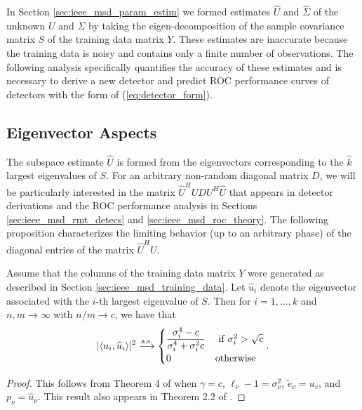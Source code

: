 In Section \ref{sec:ieee_msd_param_estim} we formed estimates $\widehat{U}$ and $\widehat{\Sigma}$ of the unknown $U$ and $\Sigma$ by taking the eigen-decomposition of the sample covariance matrix $S$ of the training data matrix $Y$. These estimates are inaccurate because the training data is noisy and contains only a finite number of observations. The following analysis specifically quantifies the accuracy of these estimates and is necessary to derive a new detector and predict ROC performance curves of detectors with the form of (\ref{eq:detector_form}).

\subsection{Eigenvector Aspects}\label{sec:ieee_msd_eigvect_aspects}

The subspace estimate $\widehat{U}$ is formed from the eigenvectors corresponding to the $\widehat{k}$ largest eigenvalues of $S$. For an arbitrary non-random diagonal matrix $D$, we will be particularly interested in the matrix $\widehat{U}^HUDU^H\widehat{U}$ that appears in detector derivations and the ROC performance analysis in Sections \ref{sec:ieee_msd_rmt_detecs} and \ref{sec:ieee_msd_roc_theory}. The following proposition characterizes the limiting behavior (up to an arbitrary phase) of the diagonal entries of the matrix $\widehat{U}^HU$.

\begin{prop}\label{th:chpt2:angles}
Assume that the columns of the training data matrix $Y$ were generated as described in Section \ref{sec:ieee_msd_training_data}. Let $\widehat{u}_{i}$ denote the eigenvector associated with the $i$-th largest eigenvalue of $S$. Then for $i = 1, \ldots, k$ and $n, m \longrightarrow \infty$ with $n/m \to c$, we have that
\begin{equation}\label{eq:chpt2:angles}
|\langle u_i,\widehat{u}_i\rangle|^2 \convas
\begin{cases}
\dfrac{\sigma_i^4-c}{\sigma_{i}^4+\sigma_{i}^2c} & \text{ if } \sigma_{i}^2>\sqrt{c}\\
0 & \textrm{otherwise}\\
\end{cases}.
\end{equation}
\end{prop}
\begin{proof}
This follows from Theorem 4 of \cite{paul2007asymptotics} when $\gamma=c$, $\ell_\nu-1=\sigma_\nu^2$, $\widetilde{e}_\nu=u_v$, and $p_\nu=\widehat{u}_\nu$. This result also appears in Theorem 2.2 of \cite{benaych2011eigenvalues}.
\end{proof}


